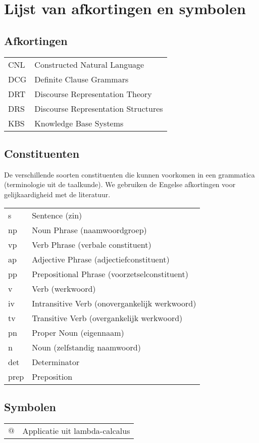 \chapter{Lijst van afkortingen en symbolen}
\section*{Afkortingen}
\begin{flushleft}
  \renewcommand{\arraystretch}{1.1}
  \begin{tabularx}{\textwidth}{@{}p{12mm}X@{}}
    CNL   & Constructed Natural Language \\
    DCG   & Definite Clause Grammars \\
    DRT   & Discourse Representation Theory \\
    DRS   & Discourse Representation Structures \\
    KBS   & Knowledge Base Systems \\
  \end{tabularx}
\end{flushleft}
\section*{Constituenten}
De verschillende soorten constituenten die kunnen voorkomen in een grammatica (terminologie uit de taalkunde). We gebruiken de Engelse afkortingen voor gelijkaardigheid met de literatuur.
\begin{flushleft}
  \renewcommand{\arraystretch}{1.1}
  \begin{tabularx}{\textwidth}{@{}p{12mm}X@{}}
    s     & Sentence (zin) \\
    np    & Noun Phrase (naamwoordgroep) \\
    vp    & Verb Phrase (verbale constituent) \\
    ap    & Adjective Phrase (adjectiefconstituent) \\
    pp    & Prepositional Phrase (voorzetselconstituent) \\
    v     & Verb (werkwoord) \\
    iv    & Intransitive Verb (onovergankelijk werkwoord) \\
    tv    & Transitive Verb (overgankelijk werkwoord) \\
    pn    & Proper Noun (eigennaam) \\
    n     & Noun (zelfstandig naamwoord) \\
    det   & Determinator \\
    prep  & Preposition \\
  \end{tabularx}
\end{flushleft}

\section*{Symbolen}
\begin{flushleft}
  \renewcommand{\arraystretch}{1.1}
  \begin{tabularx}{\textwidth}{@{}p{12mm}X@{}}
    $@$   & Applicatie uit lambda-calcalus \\
  \end{tabularx}
\end{flushleft}
